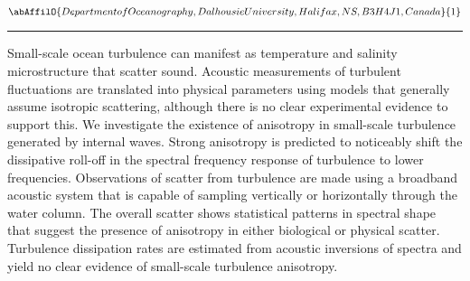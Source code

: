\begin{minipage}{\linewidth}\begin{center}\begin{minipage}{\linewidth}
   \vspace{2 mm} \begin{center}
    \vspace{2 mm}\begin{center}
  
  $\abAffilO{Department of Oceanography, Dalhousie University, Halifax, NS, B3H 4J1, Canada}{1}$

  \end{center}
  \vspace{2 mm}
  \end{center}\end{minipage}\end{center}
  \begin{center}\rule{0.70\linewidth}{0.5 pt}\end{center}
  \begin{minipage}{\linewidth}
\noindent Small-scale ocean turbulence can manifest as temperature and salinity microstructure that scatter sound. Acoustic measurements of turbulent fluctuations are translated into physical parameters using models that generally assume isotropic scattering, although there is no clear experimental evidence to support this. We investigate the existence of anisotropy in small-scale turbulence generated by internal waves. Strong anisotropy is predicted to noticeably shift the dissipative roll-off in the spectral frequency response of turbulence to lower frequencies. Observations of scatter from turbulence are made using a broadband acoustic system that is capable of sampling vertically or horizontally through the water column. The overall scatter shows statistical patterns in spectral shape that suggest the presence of anisotropy in either biological or physical scatter. Turbulence dissipation rates are estimated from acoustic inversions of spectra and yield no clear evidence of small-scale turbulence anisotropy.
\end{minipage}\end{minipage}

